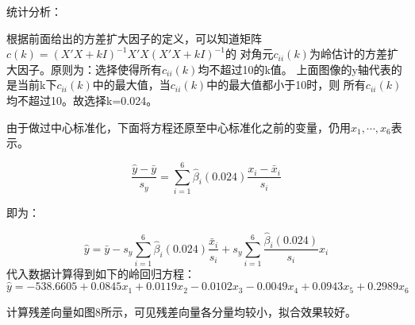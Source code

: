 \documentclass[a4paper,12pt]{article}
\begin{document}
统计分析：

根据前面给出的方差扩大因子的定义，可以知道矩阵$c(k)=(X'X+kI)^{-1}X'X(X'X+kI)^{-1}$的
对角元$c_{ii}(k)$为岭估计的方差扩大因子。原则为：选择使得所有$c_{ii}(k)$均不超过10的k值。
上面图像的y轴代表的是当前k下$c_{ii}(k)$中的最大值，当$c_{ii}(k)$中的最大值都小于10时，则
所有$c_{ii}(k)$均不超过10。故选择k=0.024。

由于做过中心标准化，下面将方程还原至中心标准化之前的变量，仍用$x_1,\cdots,x_6$表示。

$$\frac{\hat{y}-\bar{y}}{s_y}=\sum_{i=1}^{6}\hat{\beta}_i (0.024) \frac{x_i-\bar{x}_i}{s_i}$$

即为：

$$\hat{y}=\bar{y}-s_y \sum_{i=1}^{6} \hat{\beta}_i (0.024) \frac{\bar{x}_i}{s_i} + s_y \sum_{i=1}^{6} \frac{\hat{\beta}_i (0.024)}{s_i} x_i$$
代入数据计算得到如下的岭回归方程：
$$\hat{y}=-538.6605+0.0845x_1+0.0119x_2-0.0102x_3-0.0049x_4+0.0943x_5+0.2989x_6$$

计算残差向量如图8所示，可见残差向量各分量均较小，拟合效果较好。
\end{document}
